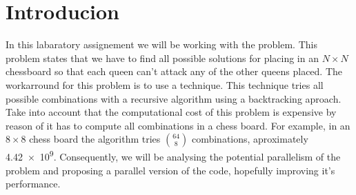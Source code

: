\section{Introducion}
\justify
In this labaratory assignement we will be working with the \nq problem.
This problem states that we have to find all possible solutions for
placing \nq in an $N \times N$ chessboard so that each queen can't
attack any of the other queens placed.
\justify
The workarround for this problem is to use a \bab technique. 
This technique tries all possible combinations with a recursive
algorithm using a backtracking aproach.
\justify
Take into account that the computational cost of this problem is expensive 
by reason of it has to compute all combinations in a chess board. 
For example, in an $8 \times 8$ chess board the algorithm tries ${64 \choose 8}$ 
combinations, aproximately \num{4.42e9}.
\justify
Consequently, we will be analysing the potential parallelism of the \nq problem
and proposing a parallel version of the code, hopefully improving it's 
performance.
